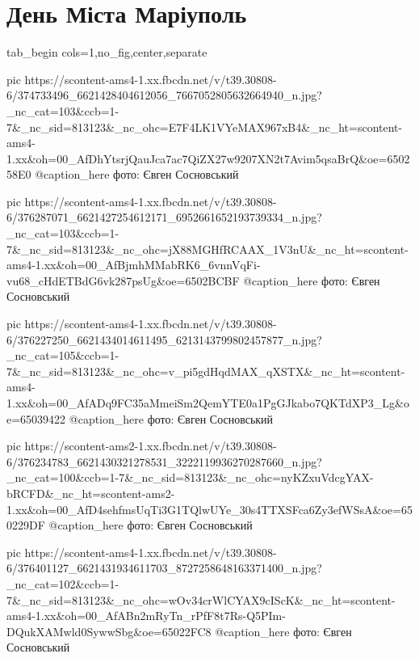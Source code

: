  
 
 
 
 


\section{День Міста Маріуполь}

\ifcmt
  tab_begin cols=1,no_fig,center,separate

     pic https://scontent-ams4-1.xx.fbcdn.net/v/t39.30808-6/374733496_6621428404612056_7667052805632664940_n.jpg?_nc_cat=103&ccb=1-7&_nc_sid=813123&_nc_ohc=E7F4LK1VYeMAX967xB4&_nc_ht=scontent-ams4-1.xx&oh=00_AfDhYtsrjQauJca7ac7QiZX27w9207XN2t7Avim5qsaBrQ&oe=650258E0
     @caption_here фото: Євген Сосновський

     pic https://scontent-ams4-1.xx.fbcdn.net/v/t39.30808-6/376287071_6621427254612171_6952661652193739334_n.jpg?_nc_cat=103&ccb=1-7&_nc_sid=813123&_nc_ohc=jX88MGHfRCAAX_1V3nU&_nc_ht=scontent-ams4-1.xx&oh=00_AfBjmhMMabRK6_6vnnVqFi-vu68_cHdETBdG6vk287psUg&oe=6502BCBF
     @caption_here фото: Євген Сосновський

     pic https://scontent-ams4-1.xx.fbcdn.net/v/t39.30808-6/376227250_6621434014611495_6213143799802457877_n.jpg?_nc_cat=105&ccb=1-7&_nc_sid=813123&_nc_ohc=v_pi5gdHqdMAX_qXSTX&_nc_ht=scontent-ams4-1.xx&oh=00_AfADq9FC35aMmeiSm2QemYTE0a1PgGJkabo7QKTdXP3_Lg&oe=65039422
     @caption_here фото: Євген Сосновський

     pic https://scontent-ams2-1.xx.fbcdn.net/v/t39.30808-6/376234783_6621430321278531_3222119936270287660_n.jpg?_nc_cat=100&ccb=1-7&_nc_sid=813123&_nc_ohc=nyKZxuVdcgYAX-bRCFD&_nc_ht=scontent-ams2-1.xx&oh=00_AfD4sehfmsUqTi3G1TQlwUYe_30s4TTXSFca6Zy3efWSsA&oe=650229DF
     @caption_here фото: Євген Сосновський

     pic https://scontent-ams4-1.xx.fbcdn.net/v/t39.30808-6/376401127_6621431934611703_8727258648163371400_n.jpg?_nc_cat=102&ccb=1-7&_nc_sid=813123&_nc_ohc=wOv34crWlCYAX9cIScK&_nc_ht=scontent-ams4-1.xx&oh=00_AfABn2mRyTn_rPfF8t7Rs-Q5PIm-DQukXAMwld0SywwSbg&oe=65022FC8
     @caption_here фото: Євген Сосновський

